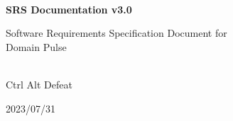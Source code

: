 \begin{titlepage}
    \centering



    \vspace{2cm}
    \hrulefill\\
    \vspace{1cm}
    {\Huge\bfseries SRS Documentation v3.0}

    \vspace{1cm}

    {\Large Software Requirements Specification Document for\\Domain Pulse}\\
    \vspace{1cm}
    \hrulefill\\

    \vfill

    {\large Ctrl Alt Defeat}

    \vspace{1cm}

    {\large 2023/07/31}\\

\end{titlepage}

